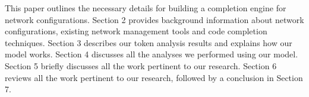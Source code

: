 This paper outlines the necessary details for building a completion engine for network configurations. Section 2 provides background information about network configurations, existing network management tools and code completion techniques. Section 3 describes our token analysis results and explains how our model works. Section 4 discusses all the analyses we performed using our model. Section 5 briefly discusses all the work pertinent to our research. Section 6 reviews all the work pertinent to our research, followed by a conclusion in Section 7.

